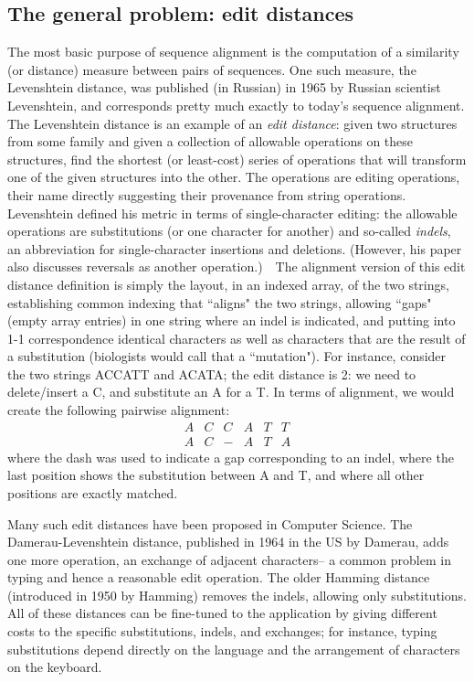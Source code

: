 \documentclass[11pt]{article}
\begin{document}
\subsection{The general problem: edit distances}
The most basic purpose of sequence alignment is the computation of a
similarity (or distance) measure between pairs of sequences.  One such
measure, the Levenshtein distance, was published (in Russian) in 1965 by
Russian scientist Levenshtein,
and corresponds pretty much exactly to today's sequence alignment.
The Levenshtein distance is an example of an \emph{edit distance}:
given two structures from some family and given a collection of allowable
operations on these structures, find the shortest (or least-cost) series
of operations that will transform one of the given structures into the
other.  The operations are editing operations, their name directly suggesting
their provenance from string operations.  Levenshtein defined his metric
in terms of single-character editing: the allowable operations are
substitutions (or one character for another) and so-called \emph{indels},
an abbreviation for single-character insertions and deletions.
(However, his paper also discusses reversals as another operation.)\ \ 
The alignment version of this edit distance definition is simply the
layout, in an indexed array, of the two strings, establishing common
indexing that ``aligns" the two strings, allowing ``gaps" (empty
array entries) in one string where an indel is indicated, and putting
into 1-1 correspondence identical characters as well as characters
that are the result of a substitution (biologists would call that a
``mutation").  For instance, consider the two strings ACCATT and ACATA;
the edit distance is 2: we need to delete/insert a C, and substitute
an A for a T.  In terms of alignment, we would create the following
pairwise alignment:
$$\begin{array}{cccccc}
    A & C & C & A & T & T\\
    A & C & - & A & T & A
  \end{array}$$
where the dash was used to indicate a gap corresponding to an indel,
where the last position shows the substitution between A and T, and
where all other positions are exactly matched.

Many such edit distances have been proposed in Computer Science.
The Damerau-Levenshtein distance, published in 1964
in the US by Damerau, adds one more operation, an exchange of adjacent
characters-- a common problem in typing and hence a reasonable edit
operation.  The older Hamming distance (introduced in 1950 by Hamming)
removes the indels, allowing only substitutions.  All of these distances
can be fine-tuned to the application by giving different costs to the
specific substitutions, indels, and exchanges; for instance, typing
substitutions depend directly on the language and the arrangement of
characters on the keyboard.
\end{document}
